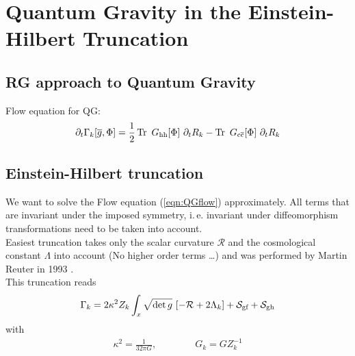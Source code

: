\chapter{Quantum Gravity in the Einstein-Hilbert Truncation}
\section{RG approach to Quantum Gravity}
Flow equation for QG:
\begin{align}
	\partial_t\Gamma_{k}[\overline{g}, \Phi] = \frac{1}{2} \operatorname{Tr}\ G_{\text{hh}}[\Phi] \ \partial_tR_k - \operatorname{Tr}\ G_{\text{c}\overline{\text{c}}}[\Phi] \ \partial_tR_k
\end{align}

\section{Einstein-Hilbert truncation}
We want to solve the Flow equation (\ref{eqn:QGflow}) approximately. All terms that are invariant under the imposed symmetry, i.\,e. invariant under diffeomorphism transformations need to be taken into account. \\

Easiest truncation takes only the scalar curvature $\mathcal{R}$ and the cosmological constant $\Lambda$ into account (No higher order terms \dots) and was performed by Martin Reuter in 1993 \cite{ReuterSaueressig2002}. \\


This truncation reads
\begin{align}
	\Gammak = 2\kappa^2Z_k \int_x \sqrt{\operatorname{det}g} \ [-\mathcal{R} + 2\Lambda_k] + \mathcal{S}_{\text{gf}} + \mathcal{S}_{\text{gh}}
\label{eqn:QGflow}
\end{align}
with 
\begin{align}
	\kappa^2 = \frac{1}{32\pi G}, \qquad\qquad G_k = GZ^{-1}_k
\end{align}

